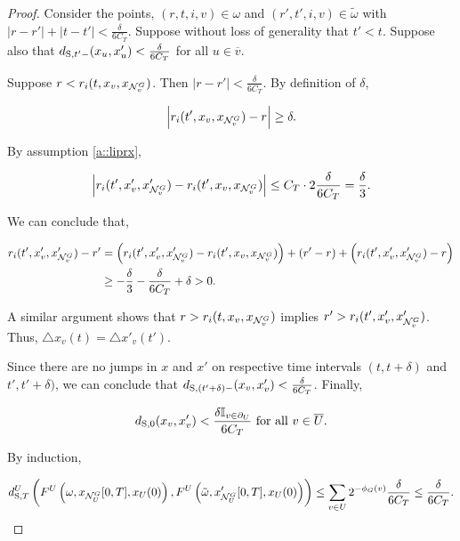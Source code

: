 \documentclass[12pt]{article}
\newcommand{\mb}{\mathbb}
\newcommand{\mc}{\mathcal}
\newcommand{\ov}{\overline}
\newcommand{\te}{\text}
\newcommand{\ind}{\hspace{24pt}}
\newcommand{\gneigh}[2]{\mc{N}^{#1}_{#2}}			%
\newcommand{\bdry}[1]{\partial_{#1}}				%
\newcommand{\cl}[1]{\ov{#1}}						%
\newcommand{\rate}{r}								%
\newcommand{\stmet}[1]{
\ifstrempty{#1}{
	d_{\te{S}}}{
	d_{\te{S},#1}}}									%
\newcommand{\xf}{x}									%
\newcommand{\delt}{\triangle}						%
\newcommand{\dpoiss}{\omega}						%
\newcommand{\vind}[1]{_{#1}}						%
\newcommand{\tme}[1]{(#1)}							%
\newcommand{\tmi}[1]{#1}							%
\newcommand{\vpara}[1]{^{#1}}						%
\newcommand{\stpara}[1]{_{#1}}						%
\newcommand{\jumpbd}[1]{C_{#1}}						%
\newcommand{\tmepro}[3]{
\ifstrempty{#3}{
	(#1,#2)}{
	(#1,#2,#3)}}									%
\newcommand{\alt}[1]{\tilde{#1}}					%
\begin{document}
\begin{proof}
\ind Consider the points, \((r,t,i,v) \in \dpoiss\) and \((r',t',i,v) \in \alt{\dpoiss}\) with \(|r - r'| + |t - t'| < \frac{\delta}{6\jumpbd{T}}\). Suppose without loss of generality that \(t' < t\). Suppose also that \(\stmet{t'-}(\xf\vind{u},\xf'\vind{u}) < \frac{\delta}{6\jumpbd{T}}\) for all \(u \in \cl{v}\). 

\ind Suppose \(r < \rate\stpara{i}\tmepro{t}{\xf\vind{v}}{\xf\vind{\gneigh{G}{v}}}\). Then \(|r - r'| < \frac{\delta}{6\jumpbd{T}}\). By definition of \(\delta\),

\[\left|\rate\stpara{i}\tmepro{t'}{\xf\vind{v}}{\xf\vind{\gneigh{G}{v}}} - r\right| \geq \delta.\]

By assumption \ref{a::liprx},

\[\left|\rate\stpara{i}\tmepro{t'}{\xf'\vind{v}}{\xf'\vind{\gneigh{G}{v}}} - \rate\stpara{i}\tmepro{t'}{\xf\vind{v}}{\xf\vind{\gneigh{G}{v}}}\right| \leq \jumpbd{T}\cdot 2\frac{\delta}{6\jumpbd{T}} = \frac{\delta}{3}.\]

We can conclude that,

\begin{align*}
\rate\stpara{i}\tmepro{t'}{\xf'\vind{v}}{\xf'\vind{\gneigh{G}{v}}} - r' &= \left(\rate\stpara{i}\tmepro{t'}{\xf'\vind{v}}{\xf'\vind{\gneigh{G}{v}}} - \rate\stpara{i}\tmepro{t'}{\xf\vind{v}}{\xf\vind{\gneigh{G}{v}}}\right) + (r'- r) + \left(\rate\stpara{i}\tmepro{t'}{\xf'\vind{v}}{\xf'\vind{\gneigh{G}{v}}} - r\right)\\
& \geq -\frac{\delta}{3} - \frac{\delta}{6\jumpbd{T}} + \delta > 0.
\end{align*}

A similar argument shows that \(r > \rate\stpara{i}\tmepro{t}{\xf\vind{v}}{\xf\vind{\gneigh{G}{v}}}\) implies \(r' > \rate\stpara{i}\tmepro{t'}{\xf'\vind{v}}{\xf'\vind{\gneigh{G}{v}}}\). Thus, \(\delt\xf\vind{v}\tme{t} = \delt\xf'\vind{v}\tme{t'}\).

\ind Since there are no jumps in \(\xf\) and \(\xf'\) on respective time intervals \((t,t+\delta)\) and \(t',t'+\delta)\), we can conclude that \(\stmet{(t' + \delta)-}(\xf\vind{v},\xf'\vind{v}) < \frac{\delta}{6\jumpbd{T}}\). Finally, 

\[\stmet{0}(\xf\vind{v},\xf'\vind{v}) < \frac{\delta\mb{I}_{v \in \bdry{U}}}{6\jumpbd{T}} \te{ for all } v \in \cl{U}.\]

By induction,

\[\stmet{T}\vpara{U}\left(F\vpara{U}\left(\dpoiss,\xf\vind{\gneigh{G}{U}}\tmi{[0,T]},\xf\vind{U}\tme{0}\right), F\vpara{U}\left(\alt{\dpoiss},\xf'\vind{\gneigh{G}{U}}\tmi{[0,T]},\xf\vind{U}\tme{0}\right)\right) \leq \sum_{v \in U}2^{-\phi_G(v)}\frac{\delta}{6\jumpbd{T}} \leq \frac{\delta}{6\jumpbd{T}}.\]


\end{proof}
\end{document}

